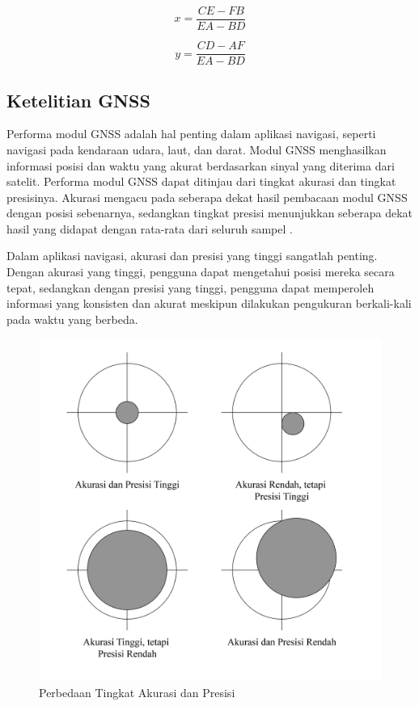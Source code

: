 \begin{equation}
	x = \frac{CE-FB}{EA-BD}
	\label{eq:2-12}
\end{equation}

\begin{equation}
	y = \frac{CD-AF}{EA-BD}
	\label{eq:2-13}
\end{equation}


\subsection{Ketelitian GNSS}
Performa modul GNSS adalah hal penting dalam aplikasi navigasi, seperti navigasi pada kendaraan udara, laut, dan darat. Modul GNSS menghasilkan informasi posisi dan waktu yang akurat berdasarkan sinyal yang diterima dari satelit. Performa modul GNSS dapat ditinjau dari tingkat akurasi dan tingkat presisinya. Akurasi mengacu pada seberapa dekat hasil pembacaan modul GNSS dengan posisi sebenarnya, sedangkan tingkat presisi menunjukkan seberapa dekat hasil yang didapat dengan rata-rata dari seluruh sampel \cite{Novatel2023}. 

Dalam aplikasi navigasi, akurasi dan presisi yang tinggi sangatlah penting. Dengan akurasi yang tinggi, pengguna dapat mengetahui posisi mereka secara tepat, sedangkan dengan presisi yang tinggi, pengguna dapat memperoleh informasi yang konsisten dan akurat meskipun dilakukan pengukuran berkali-kali pada waktu yang berbeda.

\begin{figure}[H]
	\centering
	\includegraphics[width=12cm]{contents/chapter-2/acc.png}
	\caption{Perbedaan Tingkat Akurasi dan Presisi}
	\label{Fig: acc-and-prec-diff}
\end{figure}

